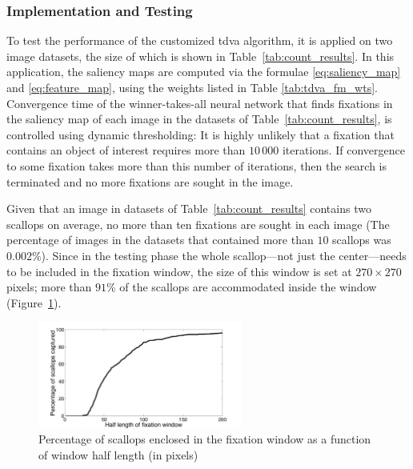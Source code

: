 \documentclass {udthesis}
\begin{document}
                                                   

\subsubsection*{Implementation and Testing}\label{sec:tdva-testing}

To test the performance of the customized \gls{tdva} algorithm, it is applied on
two image datasets, the size of which is shown in Table~\ref{tab:count_results}.
In this application, the saliency maps are computed via the formulae 
\eqref{eq:saliency_map} and \eqref{eq:feature_map},
using the weights listed in Table \ref{tab:tdva_fm_wts}.
Convergence time of the winner-takes-all neural network that finds fixations in the saliency map of each image in the datasets of Table~\ref{tab:count_results}, is controlled using dynamic thresholding:
It is highly unlikely that a fixation that contains an object of interest
requires more than $10\,000$ iterations. If convergence to some fixation takes 
more than this number of iterations, 
then the search is terminated and no more fixations
are sought in the image.

Given that an image in datasets of
Table~\ref{tab:count_results} contains two scallops on average, no more than
ten fixations are sought in each image (The percentage of images
in the datasets that contained more than $10$ scallops 
was $0.002\%$).
Since in the testing phase the whole scallop---not just the center---needs to be included in the fixation window, the size of this window is set at
$270\times270$ pixels; more than $91$\% of the scallops are accommodated inside the window (Figure~\ref{fig:window_length}). 

\begin{figure}
  \centering
  \includegraphics[width=0.60\textwidth,natwidth=800,natheight=600]{windowlength.pdf}
  \caption{Percentage of scallops enclosed in the fixation window as a function of
  window half length (in pixels)}
  \label{fig:window_length}
\end{figure}
\end{document}
